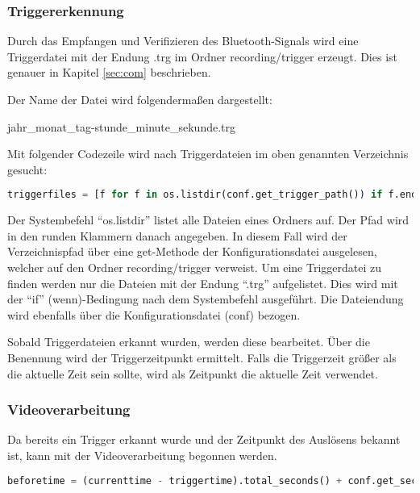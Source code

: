 \subsubsection{Triggererkennung}
\label{subsubsec:triggererkennung}

Durch das Empfangen und Verifizieren des Bluetooth-Signals wird eine Triggerdatei mit der Endung \glqq{}.trg\grqq{} im Ordner recording/trigger erzeugt. Dies ist genauer in Kapitel \ref{sec:com} beschrieben.

Der Name der Datei wird folgendermaßen dargestellt:
\begin{center}
	jahr\_monat\_tag-stunde\_minute\_sekunde.trg
\end{center}

Mit folgender Codezeile wird nach Triggerdateien im oben genannten Verzeichnis gesucht:

\begin{lstlisting}[language=Python]
triggerfiles = [f for f in os.listdir(conf.get_trigger_path()) if f.endswith(conf.get_trigger_fileextension())]
\end{lstlisting}

Der Systembefehl "`os.listdir"' listet alle Dateien eines Ordners auf. Der Pfad wird in den runden Klammern danach angegeben. In diesem Fall wird der Verzeichnispfad über eine get-Methode der Konfigurationsdatei ausgelesen, welcher auf den Ordner recording/trigger verweist. Um eine Triggerdatei zu finden werden nur die Dateien mit der Endung "`.trg"' aufgelistet. Dies wird mit der "`if"' (wenn)-Bedingung nach dem Systembefehl ausgeführt. Die Dateiendung wird ebenfalls über die Konfigurationsdatei (conf) bezogen.

Sobald Triggerdateien erkannt wurden, werden diese bearbeitet. Über die Benennung wird der Triggerzeitpunkt ermittelt. Falls die Triggerzeit größer als die aktuelle Zeit sein sollte, wird als Zeitpunkt die aktuelle Zeit verwendet.

\subsubsection{Videoverarbeitung}

Da bereits ein Trigger erkannt wurde und der Zeitpunkt des Auslösens bekannt ist, kann mit der Videoverarbeitung begonnen werden.

\begin{lstlisting}[language=Python]
beforetime = (currenttime - triggertime).total_seconds() + conf.get_secs_before()
\end{lstlisting}


